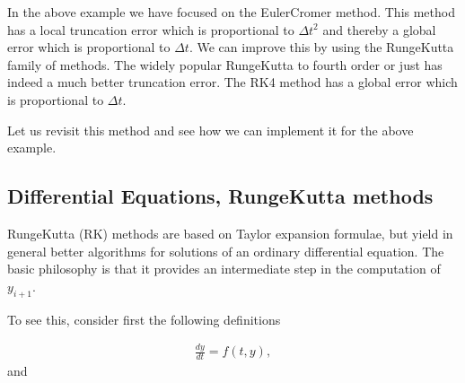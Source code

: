 \documentclass[letterpaper,10pt,english]{sphinxmanual}
\begin{document}
\begin{sphinxVerbatim}[commandchars=\\\{\}]
 
\end{sphinxVerbatim}

\noindent{}

In the above example we have focused on the Euler\sphinxhyphen{}Cromer method. This
method has a local truncation error which is proportional to \(\Delta t^2\)
and thereby a global error which is proportional to \(\Delta t\).
We can improve this by using the Runge\sphinxhyphen{}Kutta family of
methods. The widely popular Runge\sphinxhyphen{}Kutta to fourth order or just 
has indeed a much better truncation error. The RK4 method has a global
error which is proportional to \(\Delta t\).

Let us revisit this method and see how we can implement it for the above example.


\subsection{Differential Equations, Runge\sphinxhyphen{}Kutta methods}
\label{\detokenize{chapter4:differential-equations-runge-kutta-methods}}
Runge\sphinxhyphen{}Kutta (RK) methods are based on Taylor expansion formulae, but yield
in general better algorithms for solutions of an ordinary differential equation.
The basic philosophy is that it provides an intermediate step in the computation of \(y_{i+1}\).

To see this, consider first the following definitions




\begin{equation*}
\begin{split}
\begin{equation}
\frac{dy}{dt}=f(t,y),  
\label{_auto16} \tag{25}
\end{equation}
\end{split}
\end{equation*}
and
\end{document}
